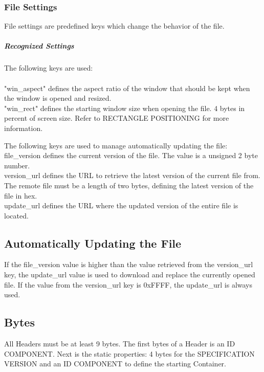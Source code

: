 \documentclass{report}
\begin{document}
\subsubsection{File Settings}
File settings are predefined keys which change the behavior of the file. 
\subparagraph{Recognized Settings}
The following keys are used:\\
\\
"win\_aspect" defines the aspect ratio of the window that should be kept when the window is opened and resized.\\
"win\_rect" defines the starting window size when opening the file. 4 bytes in percent of screen size. Refer to RECTANGLE POSITIONING for more information.

The following keys are used to manage automatically updating the file:\\
file\_version defines the current version of the file. The value is a unsigned 2 byte number.\\
version\_url defines the URL to retrieve the latest version of the current file from. The remote file must be a length of two bytes, defining the latest version of the file in hex.\\
update\_url defines the URL where the updated version of the entire file is located.


\subsection{Automatically Updating the File}
If the file\_version value is higher than the value retrieved from the version\_url key, the update\_url value is used to download and replace the currently opened file. If the value from the version\_url key is 0xFFFF, the update\_url is always used.

\subsection{Bytes}
All Headers must be at least 9 bytes. The first bytes of a Header is an ID COMPONENT. Next is the static properties: 4 bytes for the SPECIFICATION VERSION and an ID COMPONENT to define the starting Container. 
\end{document}
